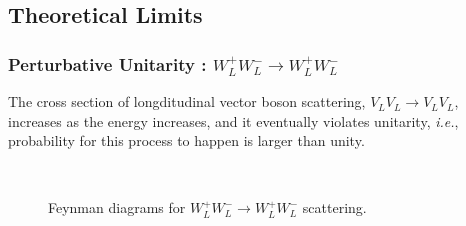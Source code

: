 \subsection{Theoretical Limits} 

\subsubsection{Perturbative Unitarity : $W_L^+W_L^- \rightarrow W_L^+W_L^-$}

The cross section of longditudinal vector boson scattering, $V_LV_L \to V_LV_L$, 
increases as the energy increases, and it eventually violates unitarity, 
\textit{i.e.}, probability for this process to happen is larger than unity. 

\begin{figure}[t]
\centering
{}
\hspace{0.5cm}
\hspace{0.5cm}
\\
\vspace{0.5cm}
\hspace{0.5cm}
\caption{Feynman diagrams for $W_L^+W_L^- \to W_L^+W_L^-$ scattering.} 
\label{fig:FD_unitary}
\end{figure}
